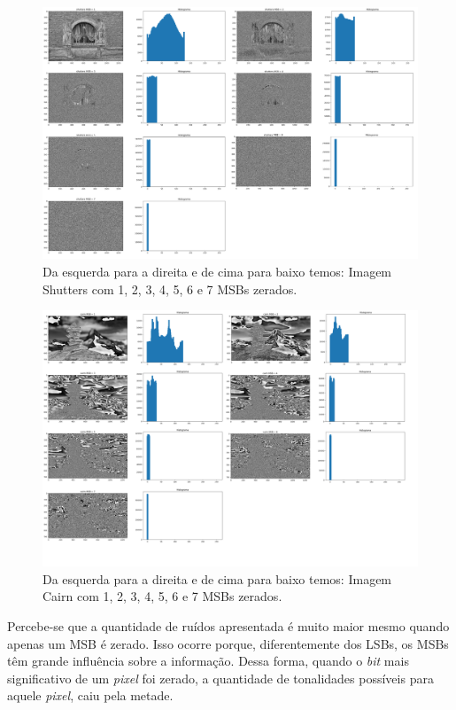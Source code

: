 \begin{figure}[h!]
    \includegraphics[width=1\linewidth]{Elementos//Figuras/shutters_msb.png}
    \caption{Da esquerda para a direita e de cima para baixo temos: Imagem Shutters com 1, 2, 3, 4, 5, 6 e 7 MSBs zerados.}
    \label{fig:shutters-msb}
\end{figure}

\begin{figure}[h!]
    \includegraphics[width=1\linewidth]{Elementos//Figuras/cairn_msb.png}
        \caption{Da esquerda para a direita e de cima para baixo temos: Imagem Cairn com 1, 2, 3, 4, 5, 6 e 7 MSBs zerados.}
    \label{fig:cairn-msb}
\end{figure}

Percebe-se que a quantidade de ruídos apresentada é muito maior mesmo quando apenas um MSB é zerado. Isso ocorre porque, diferentemente dos LSBs, os MSBs têm grande influência sobre a informação. Dessa forma, quando o \textit{bit} mais significativo de um \textit{pixel} foi zerado, a quantidade de tonalidades possíveis para aquele \textit{pixel}, caiu pela metade.

